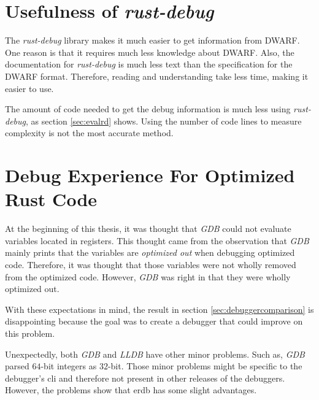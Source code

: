


\section{Usefulness of \emph{rust-debug}}
The \emph{rust-debug} library makes it much easier to get information from \gls{DWARF}.
One reason is that it requires much less knowledge about \gls{DWARF}.
Also, the documentation for \emph{rust-debug} is much less text than the specification for the \gls{DWARF} format.
Therefore, reading and understanding take less time, making it easier to use.


The amount of code needed to get the debug information is much less using \emph{rust-debug}, as section \ref{sec:evalrd} shows.
Using the number of code lines to measure complexity is not the most accurate method.



\section{Debug Experience For Optimized Rust Code}
At the beginning of this thesis, it was thought that \emph{GDB} could not evaluate variables located in registers.
This thought came from the observation that \emph{GDB} mainly prints that the variables are \emph{optimized out} when debugging optimized code.
Therefore, it was thought that those variables were not wholly removed from the optimized code.
However, \emph{GDB} was right in that they were wholly optimized out.


With these expectations in mind, the result in section \ref{sec:debuggercomparison} is disappointing because the goal was to create a debugger that could improve on this problem.


Unexpectedly, both \emph{GDB} and \emph{LLDB} have other minor problems.
Such as, \emph{GDB} parsed $64$-bit integers as $32$-bit.
Those minor problems might be specific to the debugger's \gls{cli} and therefore not present in other releases of the debuggers.
However, the problems show that \gls{erdb} has some slight advantages.




